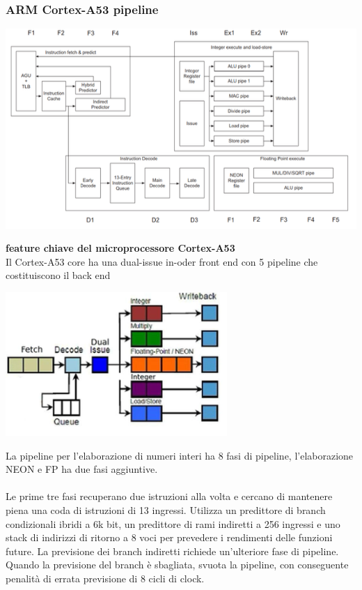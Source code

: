 \documentclass[12pt,a4paper]{article}
\begin{document}
\subsubsection{ARM Cortex-A53 pipeline}
\begin{center}
\includegraphics[width=0.6\columnwidth]{img/cortex_pipeline.png}
\end{center}
\textbf{feature chiave del microprocessore Cortex-A53}\\
Il Cortex-A53 core ha una dual-issue in-oder front end con 5 pipeline che costituiscono il back end
\begin{center}
\includegraphics[width=0.6\columnwidth]{img/cortex_pipeline_stages.png}
\end{center}
La pipeline per l'elaborazione di numeri interi ha 8 fasi di pipeline, l'elaborazione NEON e FP ha due fasi aggiuntive.\\
\\
Le prime tre fasi recuperano due istruzioni alla volta e cercano di mantenere piena una coda di istruzioni di 13 ingressi. Utilizza un predittore di branch condizionali ibridi a 6k bit, un predittore di rami indiretti a 256 ingressi e uno stack di indirizzi di ritorno a 8 voci per prevedere i rendimenti delle funzioni future. La previsione dei branch indiretti richiede un'ulteriore fase di pipeline. Quando la previsione del branch è sbagliata, svuota la pipeline, con conseguente penalità di errata previsione di 8 cicli di clock.
\end{document}
